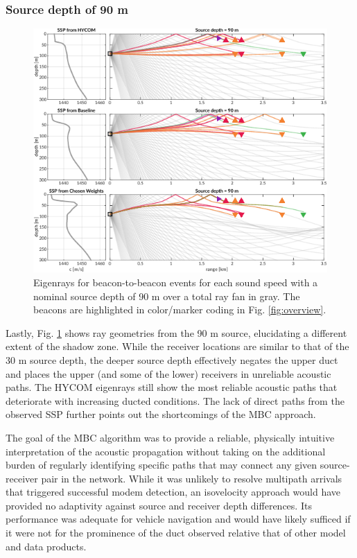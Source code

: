 \subsubsection{Source depth of 90 m}
\begin{figure}[ht!]
  \centering
  \includegraphics[width=\reprintcolumnwidth]{figs/raytrace-3env-zs-90.pdf}
  \caption{Eigenrays for beacon-to-beacon events for each sound speed with a nominal source depth of 90 m over a total ray fan in gray. The beacons are highlighted in color/marker coding in Fig. \ref{fig:overview}.}
  \label{fig:raytrace-zs90}
\end{figure}

Lastly, Fig. \ref{fig:raytrace-zs90} shows ray geometries from the 90 m source, elucidating a different extent of the shadow zone. 
While the receiver locations are similar to that of the 30 m source depth, the deeper source depth effectively negates the upper duct and places the upper (and some of the lower) receivers in unreliable acoustic paths.
The HYCOM eigenrays still show the most reliable acoustic paths that deteriorate with increasing ducted conditions.
The lack of direct paths from the observed SSP further points out the shortcomings of the MBC approach.

The goal of the MBC algorithm was to provide a reliable, physically intuitive interpretation of the acoustic propagation without taking on the additional burden of regularly identifying specific paths that may connect any given source-receiver pair in the network.
While it was unlikely to resolve multipath arrivals that triggered successful modem detection, an isovelocity approach would have provided no adaptivity against source and receiver depth differences.
Its performance was adequate for vehicle navigation and would have likely sufficed if it were not for the prominence of the duct observed relative that of other model and data products.

